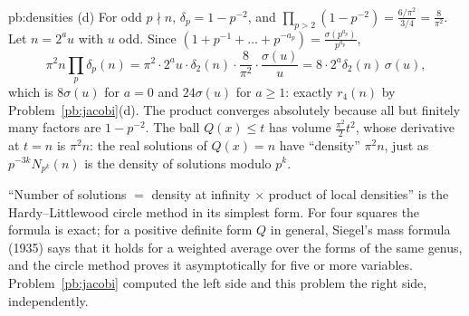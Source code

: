 \begin{solution}{pb:densities}
(d) For odd $p\nmid n$, $\delta_p=1-p^{-2}$, and $\prod_{p>2}(1-p^{-2})=\frac{6/\pi^2}{3/4}=\frac8{\pi^2}$. Let $n=2^au$ with $u$ odd. Since $(1+p^{-1}+\dots+p^{-a_p})=\frac{\sigma(p^{a_p})}{p^{a_p}}$,
\[
\pi^2n\prod_p\delta_p(n)=\pi^2\cdot2^au\cdot\delta_2(n)\cdot\frac8{\pi^2}\cdot\frac{\sigma(u)}u=8\cdot2^a\delta_2(n)\,\sigma(u),
\]
which is $8\sigma(u)$ for $a=0$ and $24\sigma(u)$ for $a\ge1$: exactly $r_4(n)$ by Problem~\ref{pb:jacobi}(d). The product converges absolutely because all but finitely many factors are
$1-p^{-2}$. The ball $Q(x)\le t$ has volume $\frac{\pi^2}2t^2$, whose derivative at $t=n$ is $\pi^2n$: the real solutions of $Q(x)=n$ have ``density'' $\pi^2n$, just as
$p^{-3k}N_{p^k}(n)$ is the density of solutions modulo $p^k$.


\leads ``Number of solutions $=$ density at infinity $\times$ product of local densities'' is the Hardy--Littlewood circle method in its simplest form. For four squares the
formula is exact; for a positive definite form $Q$ in general, Siegel's mass formula (1935) says that it holds for a weighted average over the forms of the same genus, and
the circle method proves it asymptotically for five or more variables. Problem~\ref{pb:jacobi} computed the left side and this problem the right side, independently.
\end{solution}

